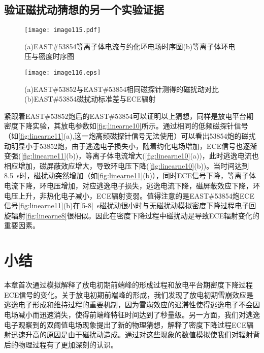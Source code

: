 \subsection{验证磁扰动猜想的另一个实验证据}
\begin{figure}[t]
\centering
\texttt{[image: image115.pdf]}
\caption{\label{fig:linearne10}(a)EAST\#53854等离子体电流与约化环电场时序图(b)等离子体环电压与密度时序图}
\end{figure}
\begin{figure}
\centering
\texttt{[image: image116.eps]}
\caption{\label{fig:linearne11}(a)EAST\#53852与EAST\#53854相同磁探针测得的磁扰动对比(b)EAST\#53854磁扰动标准差与ECE辐射}
\end{figure}
紧跟着EAST\#53852炮后的EAST\#53854可以证明以上猜想，同样是放电平台期密度下降实验，其放电参数如\autoref{fig:linearne10}所示。通过相同的低频磁探针信号（如\autoref{fig:linearne11}(a),这一炮高频磁探针信号无法使用）可以看出53854炮的磁扰动明显小于53852炮，由于逃逸电子损失小，随着约化电场增加，ECE信号也逐渐变强(\autoref{fig:linearne11}(b))，等离子体电流增大(\autoref{fig:linearne10}(a))，此时逃逸电流也相应增加，磁屏蔽效应增大，导致环电压下降(\autoref{fig:linearne10}(b))。当时间达到8.5~s时，磁扰动突然增加（如\autoref{fig:linearne11}(b)），同时ECE信号下降，等离子体电流下降，环电压增加，对应逃逸电子损失，逃逸电流下降，磁屏蔽效应下降，环电压上升，非热化电子减小，ECE辐射变弱。值得注意的是EAST\#53854炮ECE信号\autoref{fig:linearne11}(b)在[5-8]~s磁扰动很小时与无磁扰动模拟密度下降过程电子回旋辐射\autoref{fig:linearne8}很相似。因此在密度下降过程中磁扰动是导致ECE辐射变化的重要因素。  


\section{小结}
本章首次通过模拟解释了放电初期前端峰的形成过程和放电平台期密度下降过程ECE信号的变化。关于放电初期前端峰的形成，我们发现了放电初期雪崩效应是逃逸电子形成和维持过程的重要机制，因为雪崩效应的迟滞性使得逃逸电子不会因电场减小而迅速消失，使得前端峰特征时间达到了秒量级。另一方面，我们对逃逸电子观察到的双阈值电场现象提出了新的物理猜想，解释了密度下降过程ECE辐射迅速升高的原因是由于磁扰动造成。通过对这些现象的数值模拟使我们对辐射背后的物理过程有了更加深刻的认识。


